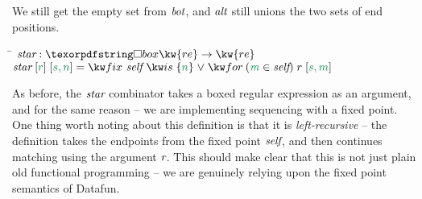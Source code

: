 %
We still get the empty set from $\text{\itshape bot}$, and $\text{\itshape alt}$ 
still unions the two sets of end positions. 
%
\begin{tabbing}
\qquad \=  $\name{star} : \iso\kw{re} \to \kw{re}$\+ \\
  $\name{star}\;\ebox{r}\;\ebox{s, n} = \efixis{\name{self}}{\eset{n} \vee 
                                                \efor{m}{\name{self}}{r\;\ebox{s,m}}}$ 
\end{tabbing}
%
As before, the $\text{\itshape star}$ combinator takes a boxed regular expression as an argument,
and for the same reason -- we are implementing sequencing with a fixed point. One thing
worth noting about this definition is that it is \emph{left-recursive} -- the definition
takes the endpoints from the fixed point $\text{\itshape self}$, and then continues matching using
the argument $\text{\itshape r}$. This should make clear that this is not just plain old functional
programming -- we are genuinely relying upon the fixed point semantics of Datafun. 
